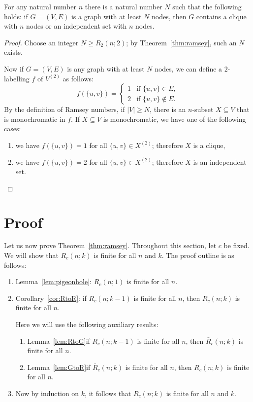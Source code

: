 \begin{lemma}
    For any natural number $n$ there is a natural number $N$ such that the following holds:
    if $G = (V,E)$ is a graph with at least $N$ nodes,
    then $G$ contains a clique with $n$ nodes or an independent set with $n$ nodes.
\end{lemma}
\begin{proof}
    Choose an integer $N \ge R_2(n;2)$; by Theorem~\ref{thm:ramsey}, such an $N$ exists.
    
    Now if $G = (V,E)$ is any graph with at least $N$ nodes, we can define a $2$-labelling $f$ of $V^{(2)}$ as follows:
    \[
        f(\{u,v\}) = \begin{cases}
            1 & \text{if } \{u,v\} \in E, \\
            2 & \text{if } \{u,v\} \notin E.
        \end{cases}
    \]
    By the definition of Ramsey numbers, if $|V| \ge N$, there is an $n$-subset $X \subseteq V$ that is monochromatic in $f$.
    If $X \subseteq V$ is monochromatic, we have one of the following cases:
    \begin{enumerate}
        \item we have $f(\{u,v\}) = 1$ for all $\{u,v\} \in X^{(2)}$; therefore $X$ is a clique,
        \item we have $f(\{u,v\}) = 2$ for all $\{u,v\} \in X^{(2)}$; therefore $X$ is an independent set. \qedhere
    \end{enumerate}
\end{proof}


\section{Proof}\label{ssec:ramsey-proof}

Let us now prove Theorem~\ref{thm:ramsey}. Throughout this section, let $c$ be fixed. We will show that $R_c(n;k)$ is finite for all $n$ and $k$. The proof outline is as follows:
\begin{enumerate}
    \item Lemma~\ref{lem:pigeonhole}: $R_c(n;1)$ is finite for all $n$.
    \item Corollary~\ref{cor:RtoR}: if $R_c(n;k-1)$ is finite for all $n$, then $R_c(n;k)$ is finite for all $n$.
    
        Here we will use the following auxiliary results:
        \begin{enumerate}[label=(\roman*)]
            \item Lemma~\ref{lem:RtoG}\mydash if $R_c(n;k-1)$ is finite for all $n$, then $\bar{R}_c(n;k)$ is finite for all $n$.
            \item Lemma~\ref{lem:GtoR}\mydash if $\bar{R}_c(n;k)$ is finite for all $n$, then $R_c(n;k)$ is finite for all $n$.
        \end{enumerate}
    \item Now by induction on $k$, it follows that $R_c(n;k)$ is finite for all $n$ and $k$.
\end{enumerate}

